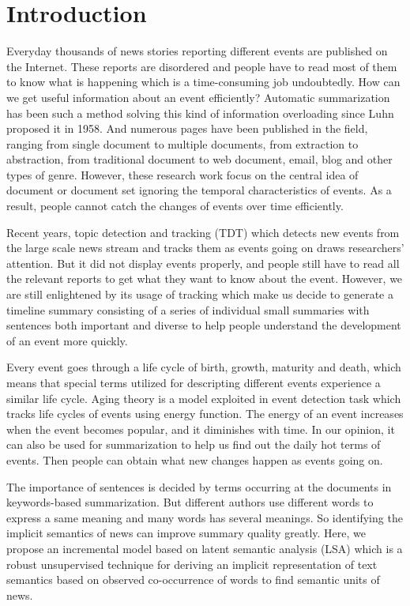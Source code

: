 \documentclass[runningheads,a4paper]{llncs}
\begin{document}
\section{Introduction}

Everyday thousands of news stories reporting different events are published on the Internet. These reports are disordered and people have to read most of them to know what is happening which is a time-consuming job undoubtedly. How can we get useful information about an event efficiently? Automatic summarization has been such a method solving this kind of information overloading since Luhn \cite{1958-Luhn-p159-165} proposed it in 1958. And numerous pages have been published in the field, ranging from single document to multiple documents, from extraction to abstraction, from traditional document to web document, email, blog and other types of genre. However, these research work focus on the central idea of document or document set ignoring the temporal characteristics of events. As a result, people cannot catch the changes of events over time efficiently. 

Recent years, topic detection and tracking (TDT) which detects new events from the large scale news stream and tracks them as events going on draws researchers' attention. But it did not display events properly, and people still have to read all the relevant reports to get what they want to know about the event. However, we are still enlightened by its usage of tracking which make us decide to generate a timeline summary consisting of a series of individual small summaries with sentences both important and diverse to help people understand the development of an event more quickly.

Every event goes through a life cycle of birth, growth, maturity and death, which means that special terms utilized for descripting different events experience a similar life cycle. Aging theory \cite{2003-Chen-p47-59} is a model exploited in event detection task which tracks life cycles of events using energy function. The energy of an event increases when the event becomes popular, and it diminishes with time. In our opinion, it can also be used for summarization to help us find out the daily hot terms of events. Then people can obtain what new changes happen as events going on.

The importance of sentences is decided by terms occurring at the documents in keywords-based summarization. But different authors use different words to express a same meaning and many words has several meanings. So identifying the implicit semantics of news can improve summary quality greatly. Here, we propose an incremental model based on latent semantic analysis (LSA) \cite{1990-Deerwester-p391-407} which is a robust unsupervised technique for deriving an implicit representation of text semantics based on observed co-occurrence of words to find semantic units of news.
\end{document}
